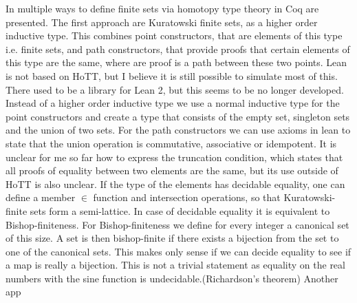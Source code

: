 \documentclass{article}
\begin{document}
In \cite{HoTT-FinSets} multiple ways to define finite sets via homotopy type theory in Coq are presented. The first approach are Kuratowski finite sets, as a higher order inductive type. This combines point constructors, that are elements of this type i.e. finite sets, and path constructors, that provide proofs that certain elements of this type are the same, where are proof is a path between these two points.
Lean is not based on HoTT, but I believe it is still possible to simulate most of this. There used to be a library for Lean 2, but this seems to be no longer developed. Instead of a higher order inductive type we use a normal inductive type for the point constructors and create a type that consists of the empty set, singleton sets and the union of two sets. For the path constructors we can use axioms in lean to state that the union operation is commutative, associative or idempotent. It is unclear for me so far how to express the truncation condition, which states that all proofs of equality between two elements are the same, but its use outside of HoTT is also unclear.
If the type of the elements has decidable equality, one can define a member $\in$ function and intersection operations, so that Kuratowski-finite sets form a semi-lattice. In case of decidable equality it is equivalent to Bishop-finiteness. For Bishop-finiteness we define for every integer a canonical set of this size. A set is then bishop-finite if there exists a bijection from the set to one of the canonical sets. This makes only sense if we can decide equality to see if a map is really a bijection. This is not a trivial statement as equality on the real numbers with the sine function is undecidable.(Richardson's theorem)
Another app
\end{document}
